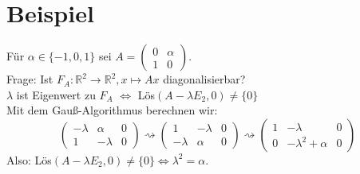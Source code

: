 \documentclass{scrbook}
\begin{document}
\section{Beispiel}
Für $\alpha \in \{-1,0,1\}$ sei $A=\left( \begin{array}{cc}
0&\alpha\\
1&0
\end{array}\right)$.\\
Frage: Ist $F_A: \mathbb{R}^2 \rightarrow \mathbb{R}^2, x \mapsto Ax$ diagonalisierbar?\\$\lambda$ ist Eigenwert zu $F_A$ $\Leftrightarrow$ Lös$(A-\lambda E_2,0)\neq \{0\}$\\
Mit dem Gauß-Algorithmus berechnen wir:\[\left(
\begin{array}{cc|c}
-\lambda &\alpha &0\\
1& -\lambda &0
\end{array}\right) \rightsquigarrow \left(\begin{array}{cc|c}
1 & -\lambda &0\\
-\lambda &\alpha &0
\end{array} \right)\rightsquigarrow\left(\begin{array}{cc|c}
1 &-\lambda &0\\
0& -\lambda^2+\alpha &0
\end{array}\right)
\]
Also: Lös$(A-\lambda E_2,0)\neq \{0\} \Leftrightarrow \lambda^2 = \alpha$.
\end{document}
